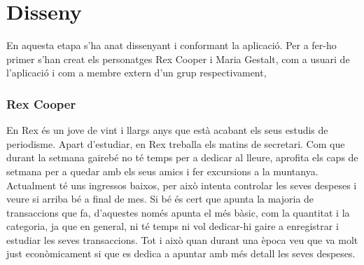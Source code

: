 \section{Disseny}
En aquesta etapa s'ha anat dissenyant i conformant la aplicació. Per a fer-ho primer s'han creat els personatges Rex Cooper i Maria Gestalt, com a usuari de l'aplicació i com a membre extern d'un grup respectivament,

\subsubsection{Rex Cooper}

En Rex és un jove de vint i llargs anys que està acabant els seus estudis de periodisme. Apart d’estudiar, en Rex treballa els matins de secretari. Com que durant la setmana gairebé no té temps per a dedicar al lleure, aprofita els caps de setmana per a quedar amb els seus amics i fer excursions a la muntanya. 
Actualment té uns ingressos baixos, per això intenta controlar les seves despeses i veure si arriba bé a final de mes. Si bé és cert que apunta la majoria de transaccions que fa, d'aquestes només apunta el més bàsic, com la quantitat i la categoria, ja que en general, ni té temps ni vol dedicar-hi gaire a enregistrar i estudiar les seves transaccions. Tot i això quan durant una època veu que va molt just econòmicament si que es dedica a apuntar amb més detall les seves despeses.

